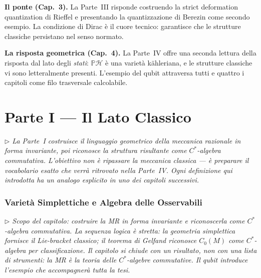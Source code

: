 \documentclass[12pt, a4paper]{article}
\newcommand{\nota}[1]{%
	\par\smallskip
	\noindent\textit{\small $\triangleright$\; #1}
	\par\smallskip
}
\begin{document}
	\medskip
	
	\textbf{Il ponte (Cap.\ 3).}
	La Parte~III risponde costruendo la strict deformation quantization di Rieffel e
	presentando la quantizzazione di Berezin come secondo esempio. La condizione di Dirac
	è il cuore tecnico: garantisce che le strutture classiche persistano nel senso normato.
	
	\medskip
	
	\textbf{La risposta geometrica (Cap.\ 4).}
	La Parte~IV offre una seconda lettura della risposta dal lato degli \emph{stati}:
	$\mathbb{P}\mathcal{H}$ è una varietà kähleriana, e le strutture classiche vi sono
	letteralmente presenti. L'esempio del qubit attraversa tutti e quattro i capitoli
	come filo trasversale calcolabile.
	
	\newpage
	\part*{Parte I --- Il Lato Classico}
	
	\nota{La Parte~I costruisce il linguaggio geometrico della meccanica razionale in forma
		invariante, poi riconosce la struttura risultante come $C^*$-algebra commutativa.
		L'obiettivo non è ripassare la meccanica classica --- è preparare il vocabolario
		esatto che verrà ritrovato nella Parte~IV. Ogni definizione qui introdotta ha un
		analogo esplicito in uno dei capitoli successivi.}
	
	\section{Varietà Simplettiche e Algebra delle Osservabili}
	
	\nota{Scopo del capitolo: costruire la MR in forma invariante e riconoscerla come
		$C^*$-algebra commutativa. La sequenza logica è stretta: la geometria simplettica
		fornisce il Lie-bracket classico; il teorema di Gelfand riconosce $C_0(M)$ come
		$C^*$-algebra per classificazione. Il capitolo si chiude con un risultato, non con
		una lista di strumenti: \emph{la MR è la teoria delle $C^*$-algebre commutative}.
		Il qubit introduce l'esempio che accompagnerà tutta la tesi.}
	
\end{document}
